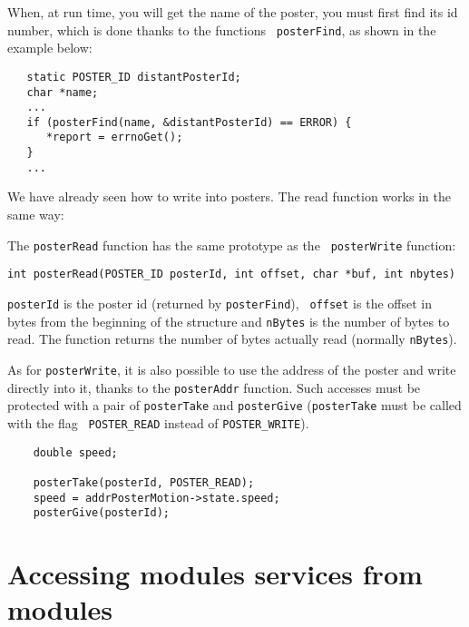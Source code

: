 When, at run time,  you will get the  name of the  poster, you must first
find  its id  number,  which   is done  thanks   to the   functions  {\tt
posterFind}, as shown in the example below:

\begin{center}\begin{cartouche}\small\begin{verbatim}
   static POSTER_ID distantPosterId;
   char *name;
   ...
   if (posterFind(name, &distantPosterId) == ERROR) {
      *report = errnoGet();
   }
   ...
\end{verbatim}\end{cartouche}\end{center}

We have  already seen how to write  into posters. The read function works
in the same way:

The   {\tt  posterRead} function   has the  same    prototype as the {\tt
posterWrite} function:

\bigbreak
{\tt int posterRead(POSTER\_ID posterId, int offset, char *buf, int nbytes)}
\bigbreak

{\tt  posterId} is  the poster id   (returned by {\tt posterFind}),  {\tt
offset} is the offset  in bytes from  the beginning of the structure  and
{\tt  nBytes} is the number  of bytes to read.   The function returns the
number of bytes actually read (normally {\tt nBytes}).

As for {\tt posterWrite},  it is also possible to  use the address of the
poster and   write  directly into  it,  thanks  to  the {\tt  posterAddr}
function. Such accesses must be protected with a pair of {\tt posterTake}
and {\tt posterGive} ({\tt posterTake} must be  called with the flag {\tt
POSTER\_READ} instead of {\tt POSTER\_WRITE}).

\begin{center}\begin{cartouche}\small\begin{verbatim}
    double speed;

    posterTake(posterId, POSTER_READ);
    speed = addrPosterMotion->state.speed;
    posterGive(posterId);
\end{verbatim}\end{cartouche}\end{center}


\section{Accessing modules services from modules}


